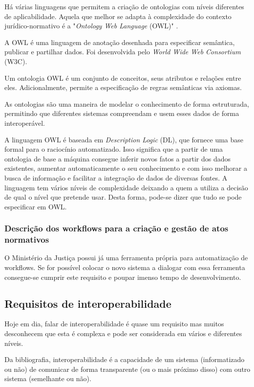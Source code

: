 Há várias linguagens que permitem a criação de ontologias com níveis diferentes de aplicabilidade.
Aquela que melhor se adapta à complexidade do contexto jurídico-normativo é a "\emph{Ontology Web Language} (OWL)" 
\cite{owl,owl2}.

A OWL é uma linguagem de anotação desenhada para especificar semântica, publicar e partilhar dados. 
Foi desenvolvida pelo \emph{World Wide Web Consortium} (W3C).

Um ontologia OWL é um conjunto de conceitos, seus atributos e relações entre eles. 
Adicionalmente, permite a especificação de regras semânticas via axiomas.

As ontologias são uma maneira de modelar o conhecimento de forma estruturada, permitindo que diferentes sistemas 
compreendam e usem esses dados de forma interoperável.

A linguagem OWL é baseada em \emph{Description Logic} (DL), que fornece uma base formal para o raciocínio automatizado. 
Isso significa que a partir de uma ontologia de base a máquina consegue inferir novos fatos a partir dos dados existentes, 
aumentar automaticamente o seu conhecimento e com isso 
melhorar a busca de informação e facilitar a integração de dados de diversas fontes.
A linguagem tem vários níveis de complexidade deixando a quem a utiliza a decisão de qual o nível que pretende usar. 
Desta forma, pode-se dizer que tudo se pode especificar em OWL.

\subsubsection{Descrição dos workflows para a criação e gestão de atos normativos}

O Ministério da Justiça possui já uma ferramenta própria para automatização de workflows. 
Se for possível colocar o novo sistema a dialogar com essa ferramenta consegue-se cumprir este requisito e 
poupar imenso tempo de desenvolvimento.


\subsection{Requisitos de interoperabilidade}

Hoje em dia, falar de interoperabilidade é quase um requisito mas muitos desconhecem que esta é complexa 
e pode ser considerada em vários e diferentes níveis.

Da bibliografia, interoperabilidade é a capacidade de um sistema (informatizado ou não) de comunicar de 
forma transparente (ou o mais próximo disso) com outro sistema (semelhante ou não).

